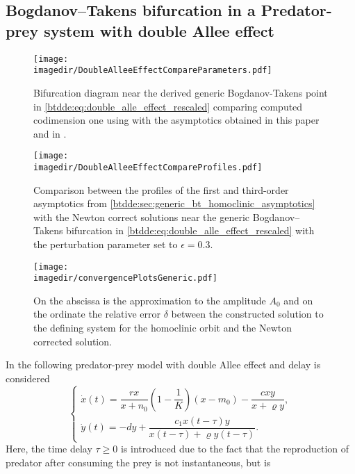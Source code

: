 \subsection{Bogdanov--Takens bifurcation in a Predator-prey system with double Allee effect}
\label{btdde:sec:example:predator_prey}
\begin{figure}[ht]
    \centering
    \texttt{[image: \\imagedir/DoubleAlleeEffectCompareParameters.pdf]}
    \caption{Bifurcation diagram near the derived generic Bogdanov-Takens point in
        \cref{btdde:eq:double_alle_effect_rescaled} comparing computed codimension one
        using \DDEBIFTOOL with the asymptotics obtained in this paper and in \cite{Jiao2021}.}
    \label{btdde:fig:DoubleAlleeEffectCompareParameters}
\end{figure}
\begin{figure}[ht]
    \centering
    \texttt{[image: \\imagedir/DoubleAlleeEffectCompareProfiles.pdf]}
    \caption{Comparison between the profiles of the first and third-order asymptotics from
    \cref{btdde:sec:generic_bt_homoclinic_asymptotics} with the Newton correct solutions near the generic
        Bogdanov--Takens bifurcation in \cref{btdde:eq:double_alle_effect_rescaled} with the
        perturbation parameter set to $\epsilon=0.3$.}
    \label{btdde:fig:DoubleAlleeEffectCompareProfiles}
\end{figure}
%
\begin{figure}[ht]
    \texttt{[image: \\imagedir/convergencePlotsGeneric.pdf]}
    \caption{On the abscissa is the approximation to the amplitude $A_0$ and on
        the ordinate the relative error $\delta$ between the constructed
        solution to the defining system
        \cite{connecting@2002} for the homoclinic orbit and the Newton
        corrected solution.}
    \label{btdde:fig:convergencePlotsGeneric}
\end{figure}
%
In \cite{Jiao2021} the following predator-prey model with double Allee effect and delay is considered
\begin{equation}
\label{btdde:eq:double_alle_effect}
\begin{cases}
    \dot x(t) = \dfrac{rx}{x+n_0}\left(1-\dfrac1 K\right)\left(x - m_0\right) - \dfrac{cxy}{x+\varrho y},\\
    \dot y(t) = -dy + \dfrac{c_1 x(t-\tau)y}{x(t-\tau) + \varrho y(t-\tau)}.
\end{cases}
\end{equation}
Here, the time delay $\tau \geq 0$ is introduced due to the fact that the
reproduction of predator after consuming the prey is not instantaneous, but is
